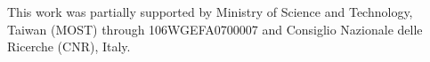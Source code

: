 \documentclass[%
 aip,
rsi,%
 amsmath,amssymb,
 reprint,%
]{revtex4-1}
\begin{document}
\begin{acknowledgments}
    This work was partially supported by Ministry of Science and Technology, Taiwan (MOST) through 106WGEFA0700007 and Consiglio Nazionale delle Ricerche (CNR), Italy.

\end{acknowledgments}






\nocite{*}

\end{document}
